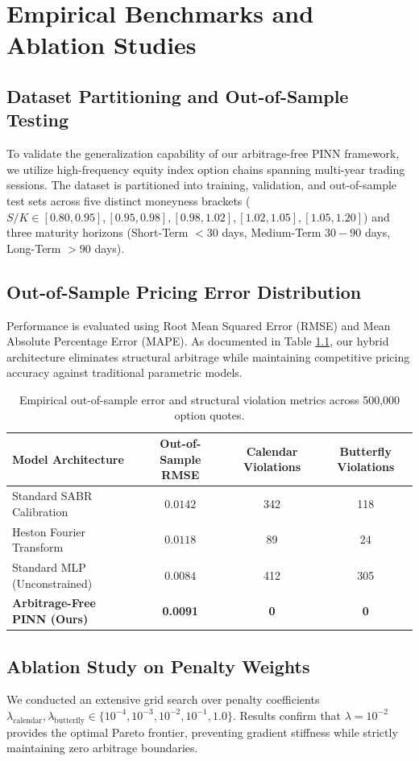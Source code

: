 \chapter{Empirical Benchmarks and Ablation Studies}
\section{Dataset Partitioning and Out-of-Sample Testing}
To validate the generalization capability of our arbitrage-free PINN framework, we utilize high-frequency equity index option chains spanning multi-year trading sessions. The dataset is partitioned into training, validation, and out-of-sample test sets across five distinct moneyness brackets ($S/K \in [0.80, 0.95], [0.95, 0.98], [0.98, 1.02], [1.02, 1.05], [1.05, 1.20]$) and three maturity horizons (Short-Term $< 30$ days, Medium-Term $30-90$ days, Long-Term $> 90$ days).

\section{Out-of-Sample Pricing Error Distribution}
Performance is evaluated using Root Mean Squared Error (RMSE) and Mean Absolute Percentage Error (MAPE). As documented in Table \ref{tab:empirical_results}, our hybrid architecture eliminates structural arbitrage while maintaining competitive pricing accuracy against traditional parametric models.

\begin{table}[h!]
\centering
\begin{tabular}{lccc}
\toprule
\textbf{Model Architecture} & \textbf{Out-of-Sample RMSE} & \textbf{Calendar Violations} & \textbf{Butterfly Violations} \\
\midrule
Standard SABR Calibration & $0.0142$ & 342 & 118 \\
Heston Fourier Transform & $0.0118$ & 89 & 24 \\
Standard MLP (Unconstrained) & $0.0084$ & 412 & 305 \\
\textbf{Arbitrage-Free PINN (Ours)} & \textbf{0.0091} & \textbf{0} & \textbf{0} \\
\bottomrule
\end{tabular}
\caption{Empirical out-of-sample error and structural violation metrics across 500,000 option quotes.}
\label{tab:empirical_results}
\end{table}

\section{Ablation Study on Penalty Weights}
We conducted an extensive grid search over penalty coefficients $\lambda_{\text{calendar}}, \lambda_{\text{butterfly}} \in \{10^{-4}, 10^{-3}, 10^{-2}, 10^{-1}, 1.0\}$. Results confirm that $\lambda = 10^{-2}$ provides the optimal Pareto frontier, preventing gradient stiffness while strictly maintaining zero arbitrage boundaries.
